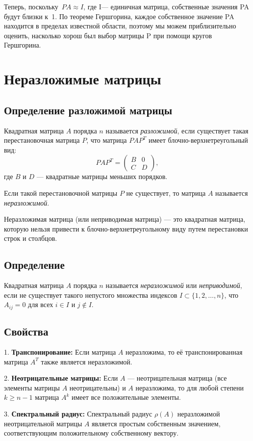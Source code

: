 \documentclass{article}
\begin{document}
Теперь, поскольку $PA\approx I$, где I— единичная матрица, собственные значения PA будут близки к 1. По теореме Гершгорина, каждое собственное значение PA находится в пределах известной области, поэтому мы можем приблизительно оценить, насколько хорош был выбор матрицы P при помощи кругов Гершгорина.
\section{Неразложимые матрицы}
\subsection*{Определение разложимой матрицы}
Квадратная матрица $A$ порядка $n$ называется \textit{разложимой}, если существует такая перестановочная матрица $P$, что матрица $PAP^T$ имеет блочно-верхнетреугольный вид:
\[
PAP^T = \begin{pmatrix}
B & 0 \\
C & D
\end{pmatrix},
\]
где $B$ и $D$ — квадратные матрицы меньших порядков.

Если такой перестановочной матрицы $P$ не существует, то матрица $A$ называется \textit{неразложимой}.


Неразложимая матрица (или неприводимая матрица) — это квадратная матрица, которую нельзя привести к блочно-верхнетреугольному виду путем перестановки строк и столбцов.
\subsection*{Определение}
Квадратная матрица $A$ порядка $n$ называется \textit{неразложимой} или \textit{неприводимой}, если не существует такого непустого множества индексов $I \subset \{1, 2, \ldots, n\}$, что $A_{ij} = 0$ для всех $i \in I$ и $j \notin I$.

\subsection*{Свойства}
1. \textbf{Транспонирование:} Если матрица $A$ неразложима, то её транспонированная матрица $A^T$ также является неразложимой.

2. \textbf{Неотрицательные матрицы:} Если $A$ — неотрицательная матрица (все элементы матрицы $A$ неотрицательны) и $A$ неразложима, то для любой степени $k \geq n-1$ матрица $A^k$ имеет все положительные элементы.

3. \textbf{Спектральный радиус:} Спектральный радиус $\rho(A)$ неразложимой неотрицательной матрицы $A$ является простым собственным значением, соответствующим положительному собственному вектору.
\end{document}
